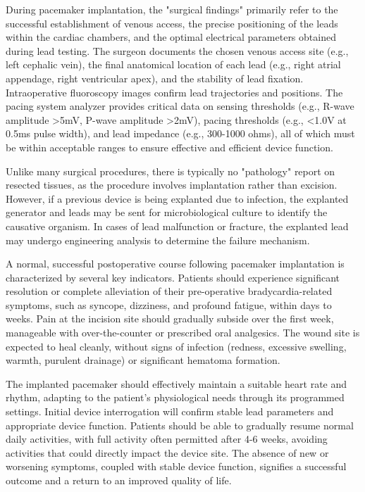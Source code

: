 During pacemaker implantation, the "surgical findings" primarily refer to the successful establishment of venous access, the precise positioning of the leads within the cardiac chambers, and the optimal electrical parameters obtained during lead testing. The surgeon documents the chosen venous access site (e.g., left cephalic vein), the final anatomical location of each lead (e.g., right atrial appendage, right ventricular apex), and the stability of lead fixation. Intraoperative fluoroscopy images confirm lead trajectories and positions. The pacing system analyzer provides critical data on sensing thresholds (e.g., R-wave amplitude >5mV, P-wave amplitude >2mV), pacing thresholds (e.g., <1.0V at 0.5ms pulse width), and lead impedance (e.g., 300-1000 ohms), all of which must be within acceptable ranges to ensure effective and efficient device function.

Unlike many surgical procedures, there is typically no "pathology" report on resected tissues, as the procedure involves implantation rather than excision. However, if a previous device is being explanted due to infection, the explanted generator and leads may be sent for microbiological culture to identify the causative organism. In cases of lead malfunction or fracture, the explanted lead may undergo engineering analysis to determine the failure mechanism.

A normal, successful postoperative course following pacemaker implantation is characterized by several key indicators. Patients should experience significant resolution or complete alleviation of their pre-operative bradycardia-related symptoms, such as syncope, dizziness, and profound fatigue, within days to weeks. Pain at the incision site should gradually subside over the first week, manageable with over-the-counter or prescribed oral analgesics. The wound site is expected to heal cleanly, without signs of infection (redness, excessive swelling, warmth, purulent drainage) or significant hematoma formation.

The implanted pacemaker should effectively maintain a suitable heart rate and rhythm, adapting to the patient's physiological needs through its programmed settings. Initial device interrogation will confirm stable lead parameters and appropriate device function. Patients should be able to gradually resume normal daily activities, with full activity often permitted after 4-6 weeks, avoiding activities that could directly impact the device site. The absence of new or worsening symptoms, coupled with stable device function, signifies a successful outcome and a return to an improved quality of life.

